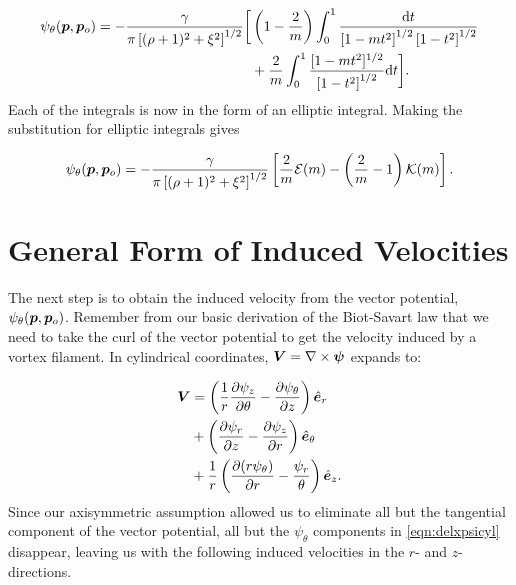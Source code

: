 \begin{equation}
    \begin{split}
        \psi_\theta(\bm{p},\bm{p}_o) = -\frac{\gamma}{\pi \left[(\rho+1)^2 + \xi^2\right]^{1/2}} \bigg[
        & \left(1-\frac{2}{m}\right) \int_{0}^{1} \frac{\mathrm{d}{t} }{\left[1 - m t^2 \right]^{1/2} \left[1-t^2\right]^{1/2}} \\
        & +\frac{2}{m} \int_{0}^{1} \frac{ [1 - mt^2]^{1/2} }{\left[1-t^2\right]^{1/2}} \mathrm{d}{t}\bigg].
    \end{split}
\end{equation}
%
Each of the integrals is now in the form of an elliptic integral.
%
Making the substitution for elliptic integrals gives

\begin{equation}
    \psi_\theta(\bm{p},\bm{p}_o) = -\frac{\gamma}{\pi \left[(\rho+1)^2 + \xi^2\right]^{1/2}} \left[  \frac{2}{m} \mathcal{E}(m) -\left(\frac{2}{m}-1\right)\mathcal{K}(m)  \right].
\end{equation}

\section{General Form of Induced Velocities}

The next step is to obtain the induced velocity from the vector potential, \(\psi_\theta(\bm{p},\bm{p}_o)\).
%
Remember from our basic derivation of the Biot-Savart law that we need to take the curl of the vector potential to get the velocity induced by a vortex filament.  In cylindrical coordinates, \(\bm{V} = \nabla \times \bm{\psi}\) expands to:

\begin{equation}
    \label{eqn:delxpsicyl}
    \begin{split}
        \bm{V} &= \left(\frac{1}{r}\frac{\partial \psi_z}{\partial \theta} - \frac{\partial \psi_\theta}{\partial z}\right)\hat{\bm{e}}_r \\
                 &+ \left(\frac{\partial \psi_r}{\partial z} - \frac{\partial \psi_z}{\partial r}\right)\hat{\bm{e}}_\theta \\
                 &+\frac{1}{r} \left(\frac{\partial (r \psi_\theta)}{\partial r} - \frac{\psi_r}{\theta}\right)\hat{\bm{e}}_z.
    \end{split}
\end{equation}
%
Since our axisymmetric assumption allowed us to eliminate all but the tangential component of the vector potential, all but the \(\psi_\theta\) components in \cref{eqn:delxpsicyl} disappear, leaving us with the following induced velocities in the \(r\)- and \(z\)-directions.


